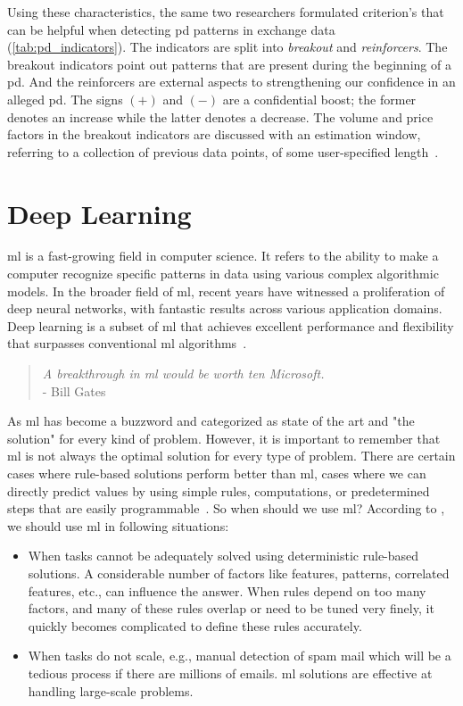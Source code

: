 

Using these characteristics, the same two researchers \cite{P&D_anatomy} formulated criterion's that can be helpful when detecting \ac{pd} patterns in exchange data (\autoref{tab:pd_indicators}). The indicators are split into \emph{breakout} and \emph{reinforcers}. The breakout indicators point out patterns that are present during the beginning of a \ac{pd}. And the reinforcers are external aspects to strengthening our confidence in an alleged \ac{pd}. The signs $(+)$ and $(-)$ are a confidential boost; the former denotes an increase while the latter denotes a decrease. The volume and price factors in the breakout indicators are discussed with an estimation window, referring to a collection of previous data points, of some user-specified length~\cite{P&D_anatomy}.


 
\section{Deep Learning}
\Acf{ml} is a fast-growing field in computer science. It refers to the ability to make a computer recognize specific patterns in data using various complex algorithmic models. In the broader field of \ac{ml}, recent years have witnessed a proliferation of deep neural networks, with fantastic results across various application domains. Deep learning is a subset of \ac{ml} that achieves excellent performance and flexibility that surpasses conventional \ac{ml} algorithms~\cite{mike_voets, dl_anomaly}.

\begin{quote}
    \emph{A breakthrough in \acl{ml} would be worth ten Microsoft.} \\- Bill Gates
\end{quote}

As \ac{ml} has become a buzzword and categorized as state of the art and "the solution" for every kind of problem. However, it is important to remember that \ac{ml} is not always the optimal solution for every type of problem. There are certain cases where rule-based solutions perform better than \ac{ml}, cases where we can directly predict values by using simple rules, computations, or predetermined steps that are easily programmable~\cite{aws}. So when should we use \ac{ml}? According to \cite{aws}, we should use \ac{ml} in following situations:

\begin{itemize}
    \item When tasks cannot be adequately solved using deterministic rule-based solutions. A considerable number of factors like features, patterns, correlated features, etc., can influence the answer. When rules depend on too many factors, and many of these rules overlap or need to be tuned very finely, it quickly becomes complicated to define these rules accurately.
    \item When tasks do not scale, e.g., manual detection of spam mail which will be a tedious process if there are millions of emails. \ac{ml} solutions are effective at handling large-scale problems.
\end{itemize}

